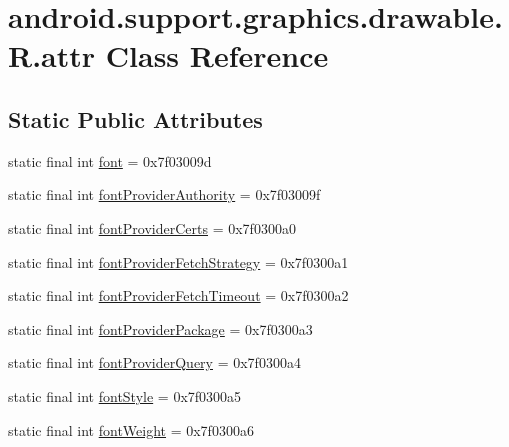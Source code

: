 \hypertarget{classandroid_1_1support_1_1graphics_1_1drawable_1_1R_1_1attr}{}\section{android.\+support.\+graphics.\+drawable.\+R.\+attr Class Reference}
\label{classandroid_1_1support_1_1graphics_1_1drawable_1_1R_1_1attr}
\subsection*{Static Public Attributes}
\begin{DoxyCompactItemize}
\item 
static final int \mbox{\hyperlink{classandroid_1_1support_1_1graphics_1_1drawable_1_1R_1_1attr_a9a73a48a0e780ef66ff0ce470452bcb7}{font}} = 0x7f03009d
\item 
static final int \mbox{\hyperlink{classandroid_1_1support_1_1graphics_1_1drawable_1_1R_1_1attr_a284d857f2e796a2591c81df32c9fae71}{font\+Provider\+Authority}} = 0x7f03009f
\item 
static final int \mbox{\hyperlink{classandroid_1_1support_1_1graphics_1_1drawable_1_1R_1_1attr_aa0c69e3aa8a365bf9fb2a0411a25cd0a}{font\+Provider\+Certs}} = 0x7f0300a0
\item 
static final int \mbox{\hyperlink{classandroid_1_1support_1_1graphics_1_1drawable_1_1R_1_1attr_afd1e49d533e0a73a1d585ea07befae36}{font\+Provider\+Fetch\+Strategy}} = 0x7f0300a1
\item 
static final int \mbox{\hyperlink{classandroid_1_1support_1_1graphics_1_1drawable_1_1R_1_1attr_a38eede4e9129d5b20dc7be4577f85d35}{font\+Provider\+Fetch\+Timeout}} = 0x7f0300a2
\item 
static final int \mbox{\hyperlink{classandroid_1_1support_1_1graphics_1_1drawable_1_1R_1_1attr_abde581ac77bee7832d90b50d2ab7eff8}{font\+Provider\+Package}} = 0x7f0300a3
\item 
static final int \mbox{\hyperlink{classandroid_1_1support_1_1graphics_1_1drawable_1_1R_1_1attr_af8dd2126a6a5003badc250c7739debde}{font\+Provider\+Query}} = 0x7f0300a4
\item 
static final int \mbox{\hyperlink{classandroid_1_1support_1_1graphics_1_1drawable_1_1R_1_1attr_ad72fb19ea3a01321edbb9f8ab4e3d4cc}{font\+Style}} = 0x7f0300a5
\item 
static final int \mbox{\hyperlink{classandroid_1_1support_1_1graphics_1_1drawable_1_1R_1_1attr_ae2c7f9b69aeb5af599fc6de1ba4fbf7c}{font\+Weight}} = 0x7f0300a6
\end{DoxyCompactItemize}


